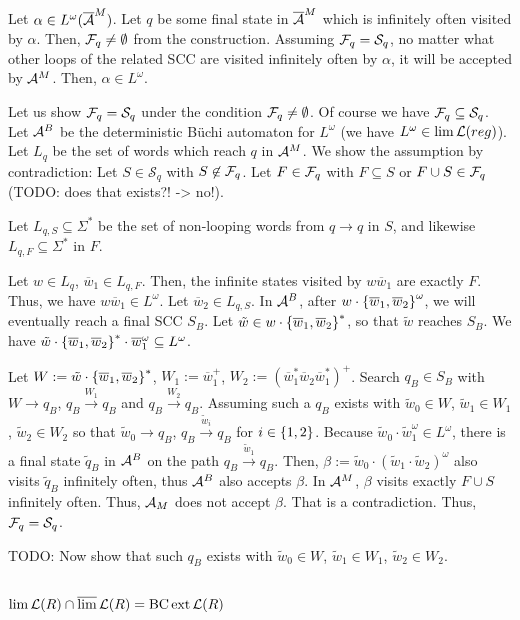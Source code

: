 Let $\alpha \in L^\omega(\overline{\mathcal{A}}^M)$. Let $q$ be some final state in $\overline{\mathcal{A}}^M$ which is infinitely often visited by $\alpha$. Then, $\mathcal{F}_q \neq \emptyset$ from the construction. Assuming $\mathcal{F}_q = \mathcal S_q$, no matter what other loops of the related SCC are visited infinitely often by $\alpha$, it will be accepted by $\mathcal{A}^M$. Then, $\alpha \in L^\omega$.

Let us show $\mathcal{F}_q = \mathcal S_q$ under the condition $\mathcal{F}_q \neq \emptyset$. Of course we have $\mathcal{F}_q \subseteq \mathcal S_q$. Let $\mathcal{A}^B$ be the deterministic Büchi automaton for $L^\omega$ (we have $L^\omega \in \lim \mathcal{L}(reg)$).
Let $L_q$ be the set of words which reach $q$ in $\mathcal{A}^M$.
We show the assumption by contradiction: Let $S \in \mathcal S_q$ with $S \not\in \mathcal{F}_q$. Let $F \in \mathcal{F}_q$ with $F \subseteq S$ or $F \cup S \in \mathcal{F}_q$ (TODO: does that exists?! -> no!).

Let $L_{q,S} \subseteq \Sigma^*$ be the set of non-looping words from $q \rightarrow q$ in $S$, and likewise $L_{q,F} \subseteq \Sigma^*$ in $F$.

Let $w \in L_q$, $\overline w_1 \in L_{q,F}$. Then, the infinite states visited by $w \overline w_1$ are exactly $F$. Thus, we have $w \overline w_1 \in L^\omega$.
Let $\overline w_2 \in L_{q,S}$.
In $\mathcal{A}^B$, after $w \cdot \Set{\overline w_1, \overline w_2}^\omega$, we will eventually reach a final SCC $S_B$. Let $\tilde w \in w \cdot \Set{\overline w_1, \overline w_2}^*$, so that $\tilde w$ reaches $S_B$. We have $\tilde w \cdot \Set{\overline w_1,\overline w_2}^* \cdot \overline w_1^\omega \subseteq L^\omega$.

Let $W := \tilde w \cdot \Set{\overline w_1,\overline w_2}^*$, $W_1 := \overline w_1^+$, $W_2 := (\overline w_1^* \overline w_2 \overline w_1^*)^+$.
Search $q_B \in S_B$ with $W \rightarrow q_B$, $q_B \xrightarrow{W_1} q_B$ and $q_B \xrightarrow{W_2} q_B$. Assuming such a $q_B$ exists with $\tilde w_0 \in W$, $\tilde w_1 \in W_1$, $\tilde w_2 \in W_2$ so that $\tilde w_0 \rightarrow q_B$, $q_B \xrightarrow{\tilde w_i} q_B$ for $i \in \Set{1,2}$. Because $\tilde w_0 \cdot \tilde w_1^\omega \in L^\omega$, there is a final state $\tilde q_B$ in $\mathcal{A}^B$ on the path $q_B \xrightarrow{\tilde w_1} q_B$. Then, $\beta := \tilde w_0 \cdot (\tilde w_1 \cdot \tilde w_2)^\omega$ also visits $\tilde q_B$ infinitely often, thus $\mathcal{A}^B$ also accepts $\beta$. In $\mathcal{A}^M$, $\beta$ visits exactly $F \cup S$ infinitely often. Thus, $\mathcal{A}_M$ does not accept $\beta$. That is a contradiction. Thus, $\mathcal{F}_q = \mathcal S_q$.

TODO: Now show that such $q_B$ exists with $\tilde w_0 \in W$, $\tilde w_1 \in W_1$, $\tilde w_2 \in W_2$.

\subsection{$\lim \mathcal{L}(R) \cap \operatorname{\overline{lim}} \mathcal{L}(R) = \operatorname{BC} \operatorname{ext} \mathcal{L}(R)$}


